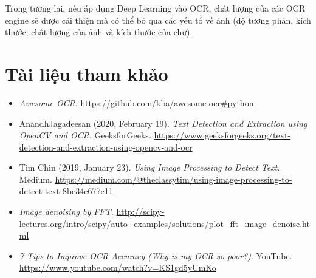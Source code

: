 \documentclass[12pt,a4paper]{article}
\begin{document}
Trong tương lai, nếu áp dụng Deep Learning vào OCR, chất lượng của các OCR engine sẽ được cải thiện mà có thể bỏ qua các yếu tố về ảnh (độ tương phản, kích thước, chất lượng của ảnh và kích thước của chữ).

\section{Tài liệu tham khảo}

\begin{itemize}
	\item \textit{Awesome OCR}. \url{https://github.com/kba/awesome-ocr\#python}
	\item AnandhJagadeesan (2020, February 19). \textit{Text Detection and Extraction using OpenCV and OCR}. GeeksforGeeks. \url{https://www.geeksforgeeks.org/text-detection-and-extraction-using-opencv-and-ocr}
	\item Tim Chin (2019, January 23). \textit{Using Image Processing to Detect Text}. Medium. \url{https://medium.com/@theclassytim/using-image-processing-to-detect-text-8be34c677c11}
	\item \textit{Image denoising by FFT.} \url{http://scipy-lectures.org/intro/scipy/auto_examples/solutions/plot_fft_image_denoise.html}
	\item \textit{7 Tips to Improve OCR Accuracy (Why is my OCR so poor?)}. YouTube. \url{https://www.youtube.com/watch?v=KS1gd5yUmKo}
\end{itemize}
\end{document}
